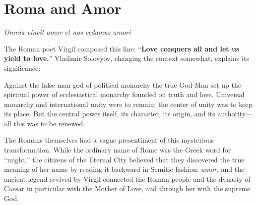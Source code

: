 \section{Roma and Amor}

\begin{quotex}
\textit{Omnia vincit amor et nos cedamus amori}
\end{quotex}


The Roman poet Virgil composed this line: ``\textbf{Love conquers all and let us yield to love.}'' Vladimir Solovyov, changing the context somewhat, explains its significance:

\begin{quotationx}
Against the false man-god of political monarchy the true God-Man set up the spiritual power of ecclesiastical monarchy founded on truth and love. Universal monarchy and international unity were to remain; the center of unity was to keep its place. But the central power itself, its character, its origin, and its authority---all this was to be renewed.

The Romans themselves had a vague presentiment of this mysterious transformation. While the ordinary name of Rome was the Greek word for ``might,'' the citizens of the Eternal City believed that they discovered the true meaning of her name by reading it backward in Semitic fashion: \emph{amor}, and the ancient legend revived by Virgil connected the Roman people and the dynasty of Caesar in particular with the Mother of Love, and through her with the supreme God.
\end{quotationx}




